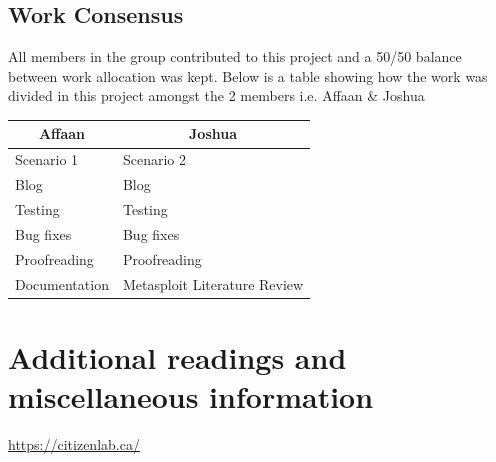 \documentclass[a4paper, 12pt, titlepage]{report}
\begin{document}
\section{Work Consensus}
All members in the group contributed to this project and a 50/50 balance between work allocation was kept. Below is a table showing how the work was divided in this project amongst the 2 members i.e. Affaan \& Joshua
\begin{table}[H]
\centering
\begin{tabular}{@{}ll@{}}
\toprule
\multicolumn{1}{c}{Affaan}   & \multicolumn{1}{c}{Joshua}         \\ \midrule
Scenario 1     & Scenario 2             \\
Blog & Blog            \\
Testing                      & Testing                            \\
Bug fixes                    & Bug fixes                          \\
Proofreading                        & Proofreading                              \\
Documentation                & Metasploit Literature Review \\ \bottomrule
\end{tabular}
\end{table}
\chapter{Additional readings and miscellaneous information}
\url{https://citizenlab.ca/}
\printbibliography[heading=bibintoc]
\end{document}
